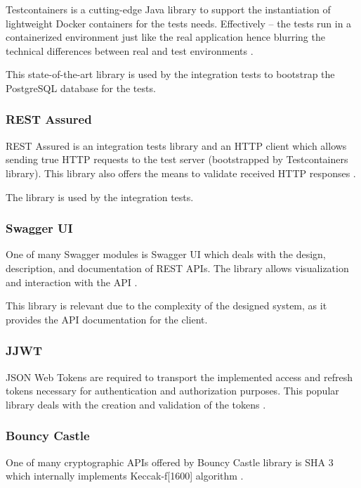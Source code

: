 \documentclass[a4paper,twoside,12pt]{book}
\begin{document}
Testcontainers is a cutting-edge Java library to support the instantiation of lightweight Docker containers for the tests needs. Effectively – the tests run in a containerized environment just like the real application hence blurring the technical differences between real and test environments \cite{bib:testcontainers}.

This state-of-the-art library is used by the integration tests to bootstrap the PostgreSQL database for the tests.

\subsubsection{REST Assured}

REST Assured is an integration tests library and an HTTP client which allows sending true HTTP requests to the test server (bootstrapped by Testcontainers library). This library also offers the means to validate received HTTP responses \cite{bib:rest_assured}.

The library is used by the integration tests.

\subsubsection{Swagger UI}

One of many Swagger modules is Swagger UI which deals with the design, description, and documentation of REST APIs. The library allows visualization and interaction with the API \cite{bib:swagger}.

This library is relevant due to the complexity of the designed system, as it provides the API documentation for the client.

\subsubsection{JJWT}

JSON Web Tokens are required to transport the implemented access and refresh tokens necessary for authentication and authorization purposes. This popular library deals with the creation and validation of the tokens \cite{bib:jjwt}.

\subsubsection{Bouncy Castle}

One of many cryptographic APIs offered by Bouncy Castle library is SHA 3 which internally implements Keccak-f[1600] algorithm \cite{bib:bouncy_castle}.
\end{document}
